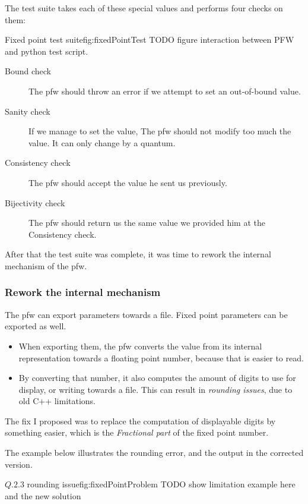 The test suite takes each of these special values and performs four checks on
them:

\begin{figureGraphics}{Fixed point test suite}{fig:fixedPointTest}
    TODO figure interaction between PFW and python test script.
\end{figureGraphics}

\begin{description}
    \item[Bound check] The \gls{pfw} should throw an error if we
        attempt to set an out-of-bound value.
    \item[Sanity check] If we manage to set the value, The \gls{pfw} should not modify too much
        the value. It can only change by a quantum.
    \item[Consistency check] The \gls{pfw} should accept the value he sent us previously.
    \item[Bijectivity check] The \gls{pfw} should return us the same value we provided him at the Consistency check.
\end{description}

After that the test suite was complete, it was time to rework the internal
mechanism of the \gls{pfw}.

\subsubsection{Rework the internal mechanism}
The \gls{pfw} can export parameters towards a file. Fixed
point parameters can be exported as well.
\begin{itemize}
    \item When exporting them, the \gls{pfw} converts the value from
        its internal representation towards a floating point number, because that is
        easier to read.
    \item By converting that number, it also computes the amount of digits
        to use for display, or writing towards a file. This can result in
        \emph{rounding issues}, due to old C++ limitations.
\end{itemize}
The fix I proposed was to replace the computation of displayable digits by something
easier, which is the \emph{Fractional part} of the fixed point number.

The example below illustrates the rounding error, and the output in the corrected version.
\begin{figureGraphics}{$Q.2.3$ rounding issue}{fig:fixedPointProblem}
    TODO show limitation example here and the new solution\\
\end{figureGraphics}


